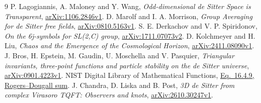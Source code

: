\documentclass[11pt,a4paper]{article}
\begin{document}
\begin{thebibliography}{9}
 P. Lagogiannis, A. Maloney and Y. Wang,
\emph{Odd-dimensional de Sitter Space is Transparent},
\href{https://arxiv.org/html/1106.2846v1}{arXiv:1106.2846v1}.
 D. Marolf and I. A. Morrison,
\emph{Group Averaging for de Sitter free fields},
\href{https://arxiv.org/html/0810.5163v1}{arXiv:0810.5163v1}.
 S. E. Derkachov and V. P. Spiridonov,
\emph{On the 6j-symbols for SL(2,C) group},
\href{https://arxiv.org/html/1711.07073v2}{arXiv:1711.07073v2}.
 D. Kolchmeyer and H. Liu,
\emph{Chaos and the Emergence of the Cosmological Horizon},
\href{https://arxiv.org/html/2411.08090v1}{arXiv:2411.08090v1}.
 J. Bros, H. Epstein, M. Gaudin, U. Moschella and V. Pasquier,
\emph{Triangular invariants, three-point functions and particle stability
on the de Sitter universe},
\href{https://arxiv.org/html/0901.4223v1}{arXiv:0901.4223v1}.
 NIST Digital Library of Mathematical Functions,
\href{https://dlmf.nist.gov/16.4.E9}{Eq.\ 16.4.9, Rogers--Dougall sum}.
 J. Chandra, D. Liska and B. Post,
\emph{3D de Sitter from complex Virasoro TQFT: Observers and knots},
\href{https://arxiv.org/html/2610.30247v1}{arXiv:2610.30247v1}.
\end{thebibliography}
\end{document}

